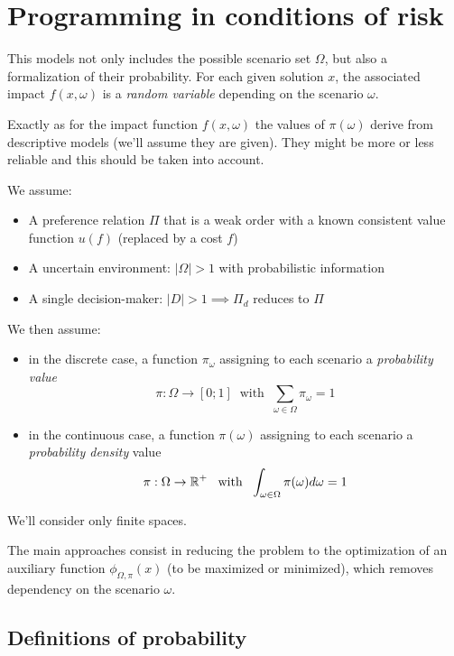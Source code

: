 \chapter{Programming in conditions of risk}
\label{ch:risk}

This models not only includes the possible scenario set $\Omega$, but also a formalization of their probability. For each given solution $x$, the associated impact $f (x, \omega)$ is a \textit{random variable} depending on the scenario $\omega$. 

Exactly as for the impact function $f(x, \omega)$ the values of $\pi (\omega)$ derive from descriptive models (we'll assume they are given). They might be more or less reliable and this should be taken into account.

We assume:
\begin{itemize}
	\item A preference relation $\Pi$ that is a weak order with a known consistent value function $u(f)$ (replaced by a cost $f$)
	
	\item A uncertain environment: $|\Omega| > 1$ with probabilistic information
	
	\item A single decision-maker: $|D|>1 \implies \Pi_d$ reduces to $\Pi$
\end{itemize}

We then assume:
\begin{itemize}
	\item in the discrete case, a function $\pi_\omega$ assigning to each scenario a \textit{probability value}
	$$ \pi: \Omega \rightarrow [0;1] \ \text{ with } \ \sum_{\omega \in \Omega} \pi_\omega = 1 $$
	
	\item in the continuous case, a function $\pi (\omega)$ assigning to each scenario a \textit{probability density} value
	$$ \pi: \Omega \rightarrow \R^+ \ \text{ with } \ \int_{\omega \in \Omega} \pi (\omega) d \omega = 1 $$
\end{itemize}
We'll consider only finite spaces.

The main approaches consist in reducing the problem to the optimization of an auxiliary function $\phi_{\Omega, \pi} (x)$ (to be maximized or minimized), which removes dependency on the scenario $\omega$.

\section{Definitions of probability}
\label{sec:probdef}

